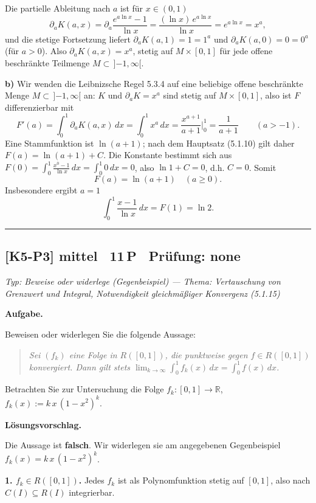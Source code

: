 \documentclass[a4paper,11pt]{article}
\begin{document}
Die partielle Ableitung nach $a$ ist für $x\in(0,1)$
\[ \partial_a K(a,x)=\partial_a\frac{e^{a\ln x}-1}{\ln x}=\frac{(\ln x)\,e^{a\ln x}}{\ln x}=e^{a\ln x}=x^a, \]
und die stetige Fortsetzung liefert $\partial_a K(a,1)=1=1^a$ und $\partial_a K(a,0)=0=0^a$ (für $a>0$). Also $\partial_a K(a,x)=x^a$, stetig auf $M\times[0,1]$ für jede offene beschränkte Teilmenge $M\subset\,]{-1},\infty[$.

\textbf{b)} Wir wenden die Leibnizsche Regel 5.3.4 auf eine beliebige offene beschränkte Menge $M\subset\,]{-1},\infty[$ an: $K$ und $\partial_a K=x^a$ sind stetig auf $M\times[0,1]$, also ist $F$ differenzierbar mit
\[ F'(a)=\int_0^1 \partial_a K(a,x)\,dx=\int_0^1 x^a\,dx=\frac{x^{a+1}}{a+1}\Big|_0^1=\frac{1}{a+1}\qquad(a>-1). \]
Eine Stammfunktion ist $\ln(a+1)$; nach dem Hauptsatz (5.1.10) gilt daher $F(a)=\ln(a+1)+C$. Die Konstante bestimmt sich aus $F(0)=\int_0^1 \frac{x^0-1}{\ln x}\,dx=\int_0^1 0\,dx=0$, also $\ln 1+C=0$, d.h. $C=0$. Somit
\[ \boxed{F(a)=\ln(a+1)\quad(a\ge 0).} \]
Insbesondere ergibt $a=1$
\[ \int_0^1 \frac{x-1}{\ln x}\,dx = F(1)=\ln 2. \]\par\bigskip\hrule\bigskip
\subsection*{[K5-P3] \normalfont mittel \textbullet\ 11\,P \textbullet\ Pr\"ufung: none}
\textit{Typ: Beweise oder widerlege (Gegenbeispiel)  ---  Thema: Vertauschung von Grenzwert und Integral, Notwendigkeit gleichmäßiger Konvergenz (5.1.15)}\par\smallskip
\textbf{Aufgabe.}\par
Beweisen oder widerlegen Sie die folgende Aussage:
\begin{quote}
\itshape Sei $(f_k)$ eine Folge in $R([0,1])$, die punktweise gegen $f\in R([0,1])$ konvergiert. Dann gilt stets $\displaystyle\lim_{k\to\infty}\int_0^1 f_k(x)\,dx=\int_0^1 f(x)\,dx$.
\end{quote}
Betrachten Sie zur Untersuchung die Folge $f_k:[0,1]\to\mathbb{R}$, $f_k(x):=k\,x\,(1-x^2)^k$.\par\smallskip
\textbf{L\"osungsvorschlag.}\par
Die Aussage ist \textbf{falsch}. Wir widerlegen sie am angegebenen Gegenbeispiel $f_k(x)=k\,x\,(1-x^2)^k$.

\textbf{1. $f_k\in R([0,1])$.} Jedes $f_k$ ist als Polynomfunktion stetig auf $[0,1]$, also nach $C(I)\subseteq R(I)$ integrierbar.
\end{document}
